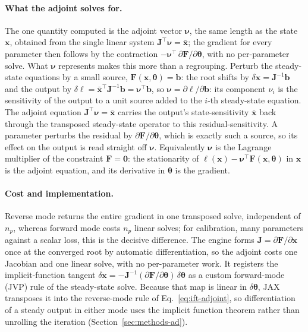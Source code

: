 \documentclass{article}
\begin{document}
\paragraph{What the adjoint solves for.} The one quantity computed is the adjoint vector \(\boldsymbol{\nu}\), the same length as the state \(\mathbf{x}\), obtained from the single linear system \(\mathbf{J}^{\top}\boldsymbol{\nu}=\bar{\mathbf{x}}\); the gradient for every parameter then follows by the contraction \(-\boldsymbol{\nu}^{\top}\,\partial\mathbf{F}/\partial\boldsymbol{\theta}\), with no per-parameter solve. What \(\boldsymbol{\nu}\) represents makes this more than a regrouping. Perturb the steady-state equations by a small source, \(\mathbf{F}(\mathbf{x},\boldsymbol{\theta})=\mathbf{b}\): the root shifts by \(\delta\mathbf{x}=\mathbf{J}^{-1}\mathbf{b}\) and the output by \(\delta\ell=\bar{\mathbf{x}}^{\top}\mathbf{J}^{-1}\mathbf{b}=\boldsymbol{\nu}^{\top}\mathbf{b}\), so \(\boldsymbol{\nu}=\partial\ell/\partial\mathbf{b}\): its component \(\nu_i\) is the sensitivity of the output to a unit source added to the \(i\)-th steady-state equation. The adjoint equation \(\mathbf{J}^{\top}\boldsymbol{\nu}=\bar{\mathbf{x}}\) carries the output's state-sensitivity \(\bar{\mathbf{x}}\) back through the transposed steady-state operator to this residual-sensitivity. A parameter perturbs the residual by \(\partial\mathbf{F}/\partial\boldsymbol{\theta}\), which is exactly such a source, so its effect on the output is read straight off \(\boldsymbol{\nu}\). Equivalently \(\boldsymbol{\nu}\) is the Lagrange multiplier of the constraint \(\mathbf{F}=\mathbf{0}\): the stationarity of \(\ell(\mathbf{x})-\boldsymbol{\nu}^{\top}\mathbf{F}(\mathbf{x},\boldsymbol{\theta})\) in \(\mathbf{x}\) is the adjoint equation, and its derivative in \(\boldsymbol{\theta}\) is the gradient.

\paragraph{Cost and implementation.} Reverse mode returns the entire gradient in one transposed solve, independent of \(n_p\), whereas forward mode costs \(n_p\) linear solves; for calibration, many parameters against a scalar loss, this is the decisive difference. The engine forms \(\mathbf{J}=\partial\mathbf{F}/\partial\mathbf{x}\) once at the converged root by automatic differentiation, so the adjoint costs one Jacobian and one linear solve, with no per-parameter work. It registers the implicit-function tangent \(\delta\mathbf{x}=-\mathbf{J}^{-1}(\partial\mathbf{F}/\partial\boldsymbol{\theta})\,\delta\boldsymbol{\theta}\) as a custom forward-mode (JVP) rule of the steady-state solve. Because that map is linear in \(\delta\boldsymbol{\theta}\), JAX transposes it into the reverse-mode rule of Eq.~\eqref{eq:ift-adjoint}, so differentiation of a steady output in either mode uses the implicit function theorem rather than unrolling the iteration (Section~\ref{sec:methods-ad}).
\end{document}
